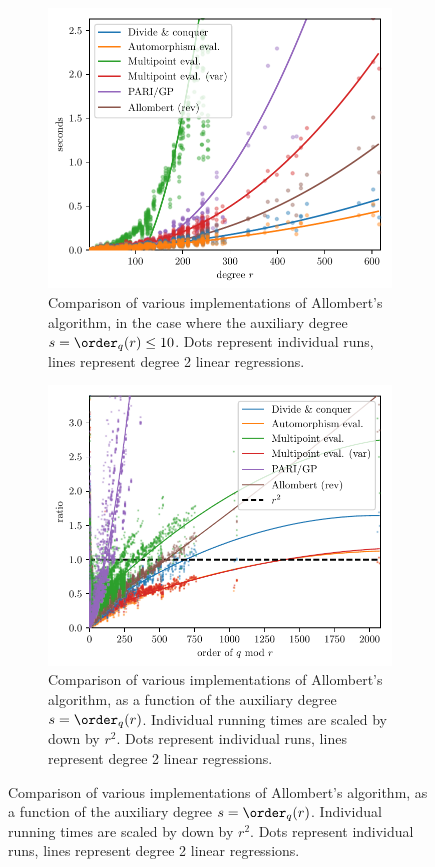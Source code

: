 \begin{figure}
  \newlength{\mywidth}
  \setlength{\mywidth}{6cm}
  \centering

  \begin{subfigure}{.48\textwidth}
    \includegraphics[width=\mywidth]{ffisom/bench-allombert-lowaux}
    \caption{Comparison of various implementations of Allombert's
      algorithm, in the case where the auxiliary degree
      $s=\order_q(r)\le 10$.  Dots represent individual runs, lines
      represent degree 2 linear regressions.}
    \label{fig:bench:allombert-lowaux}
  \end{subfigure}
  \hfill
  \begin{subfigure}{.48\textwidth}
    \noindent
    \includegraphics[width=\mywidth]{ffisom/bench-allombert-anyaux}
    \caption{Comparison of various implementations of Allombert's
      algorithm, as a function of the auxiliary degree
      $s=\order_q(r)$.  Individual running times are scaled by down by
      $r^2$.  Dots represent individual runs, lines represent degree 2
      linear regressions.}
    \label{fig:bench:allombert-anyaux}
  \end{subfigure}


\end{figure}

